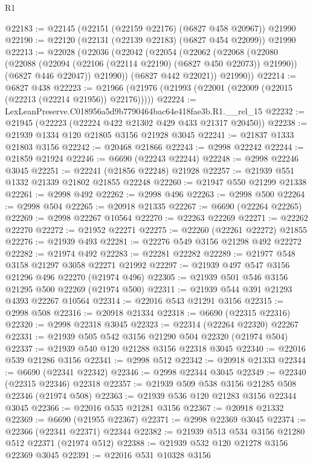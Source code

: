 \begin{lexlean}{R1}
\begin{coremodule}
@22183 := @22145 (@22151 (@22159 @22176) (@6827 @458 @20967)) @21990
@22190 := @22120 (@22131 (@22139 @22183) (@6827 @454 @22099)) @21990
@22213 := @22028
    (@22036
      (@22042
        (@22054
          (@22062
            (@22068
              (@22080
                (@22088 (@22094 (@22106 (@22114 @22190) (@6827 @450 @22073)) @21990))
                (@6827 @446 @22047))
              @21990))
          (@6827 @442 @22021))
        @21990))
@22214 := @6827 @438
@22223 := @21966 (@21976 (@21993 (@22001 (@22009 (@22015 (@22213 (@22214 @21956)) @22176)))))
@22224 := LexLeanPreserve.C018956a5d9b7790464bac64e418fae3b.R1.__rel_15
@22232 := @21945 (@22223 (@22224 @422 @21302 @429 @433 @21317 @20450))
@22238 := @21939 @1334 @120 @21805 @3156 @21928 @3045
@22241 := @21837 @1333 @21803 @3156
@22242 := @20468 @21866
@22243 := @2998 @22242
@22244 := @21859 @21924
@22246 := @6690 (@22243 @22244)
@22248 := @2998 @22246 @3045
@22251 := @22241 (@21856 @22248) @21928
@22257 := @21939 @551 @1332 @21339 @21802 @21855 @22248
@22260 := @21947 @550 @21299 @21338
@22261 := @2998 @492
@22262 := @2998 @496
@22263 := @2998 @500
@22264 := @2998 @504
@22265 := @20918 @21335
@22267 := @6690 (@22264 @22265)
@22269 := @2998 @22267 @10564
@22270 := @22263 @22269
@22271 := @22262 @22270
@22272 := @21952 @22271
@22275 := @22260 (@22261 @22272) @21855
@22276 := @21939 @493
@22281 := @22276 @549 @3156 @21298 @492 @22272
@22282 := @21974 @492
@22283 := @22281 @22282
@22289 := @21977 @548 @3158 @21297 @3058 @22271 @21992
@22297 := @21939 @497 @547 @3156 @21296 @496 @22270 (@21974 @496)
@22305 := @21939 @501 @546 @3156 @21295 @500 @22269 (@21974 @500)
@22311 := @21939 @544 @391 @21293 @4393 @22267 @10564
@22314 := @22016 @543 @21291 @3156
@22315 := @2998 @508
@22316 := @20918 @21334
@22318 := @6690 (@22315 @22316)
@22320 := @2998 @22318 @3045
@22323 := @22314 (@22264 @22320) @22267
@22331 := @21939 @505 @542 @3156 @21290 @504 @22320 (@21974 @504)
@22337 := @21939 @540 @120 @21288 @3156 @22318 @3045
@22340 := @22016 @539 @21286 @3156
@22341 := @2998 @512
@22342 := @20918 @21333
@22344 := @6690 (@22341 @22342)
@22346 := @2998 @22344 @3045
@22349 := @22340 (@22315 @22346) @22318
@22357 := @21939 @509 @538 @3156 @21285 @508 @22346 (@21974 @508)
@22363 := @21939 @536 @120 @21283 @3156 @22344 @3045
@22366 := @22016 @535 @21281 @3156
@22367 := @20918 @21332
@22369 := @6690 (@21955 @22367)
@22371 := @2998 @22369 @3045
@22374 := @22366 (@22341 @22371) @22344
@22382 := @21939 @513 @534 @3156 @21280 @512 @22371 (@21974 @512)
@22388 := @21939 @532 @120 @21278 @3156 @22369 @3045
@22391 := @22016 @531 @10328 @3156

\end{coremodule}
\end{lexlean}
